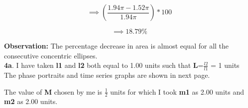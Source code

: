 \documentclass[11pt]{scrartcl} %
\begin{document}
\begin{equation*}
\implies (\frac{1.94\pi-1.52\pi}{1.94\pi})*100
\end{equation*}

\begin{equation*}
\implies 18.79 \%
\end{equation*}

\textbf{Observation:}
The percentage decrease in area is almost equal for all the consecutive concentric ellipses.\\

\textbf{4a}.
I have taken \textbf{l1} and \textbf{l2} both equal to 1.00 units such that \textbf{L}=$\frac{l2}{l1}$ = 1 units\\

The phase portraits and time series graphs are shown in next page.

The value of \textbf{M} chosen by me is $\frac{1}{2}$ units for which I took \textbf{m1} as 2.00 units and \textbf{m2} as 2.00 units.\newpage
\end{document}
